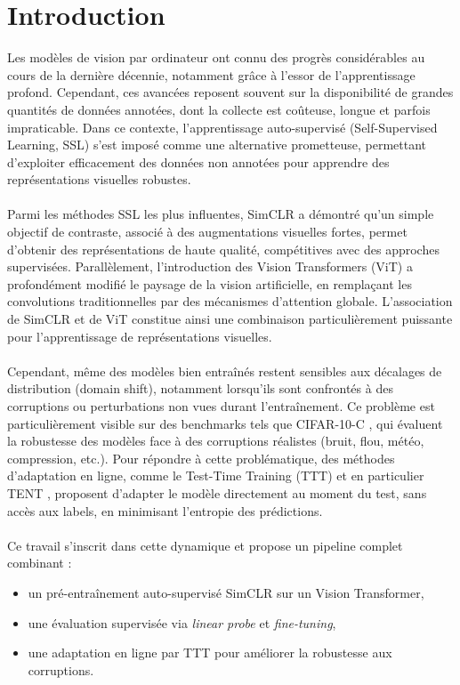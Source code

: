 \documentclass[12pt,a4paper]{report}
\begin{document}
	\chapter{Introduction}	
	Les modèles de vision par ordinateur ont connu des progrès considérables au cours de la dernière décennie, notamment grâce à l’essor de l’apprentissage profond. Cependant, ces avancées reposent souvent sur la disponibilité de grandes quantités de données annotées, dont la collecte est coûteuse, longue et parfois impraticable. Dans ce contexte, l’apprentissage auto-supervisé (Self-Supervised Learning, SSL) s’est imposé comme une alternative prometteuse, permettant d’exploiter efficacement des données non annotées pour apprendre des représentations visuelles robustes.\\\\
	Parmi les méthodes SSL les plus influentes, SimCLR \cite{chen2020simclr} a démontré qu’un simple objectif de contraste, associé à des augmentations visuelles fortes, permet d’obtenir des représentations de haute qualité, compétitives avec des approches supervisées. Parallèlement, l’introduction des Vision Transformers (ViT) \cite{dosovitskiy2020vit} a profondément modifié le paysage de la vision artificielle, en remplaçant les convolutions traditionnelles par des mécanismes d’attention globale. L’association de SimCLR et de ViT constitue ainsi une combinaison particulièrement puissante pour l’apprentissage de représentations visuelles.\\\\
	Cependant, même des modèles bien entraînés restent sensibles aux décalages de distribution (domain shift), notamment lorsqu’ils sont confrontés à des corruptions ou perturbations non vues durant l’entraînement. Ce problème est particulièrement visible sur des benchmarks tels que CIFAR-10-C \cite{hendrycks2019benchmark}, qui évaluent la robustesse des modèles face à des corruptions réalistes (bruit, flou, météo, compression, etc.). Pour répondre à cette problématique, des méthodes d’adaptation en ligne, comme le Test-Time Training (TTT) et en particulier TENT \cite{wang2021tent}, proposent d’adapter le modèle directement au moment du test, sans accès aux labels, en minimisant l’entropie des prédictions.\\\\
	Ce travail s’inscrit dans cette dynamique et propose un pipeline complet combinant :
	\begin{itemize}
		\item un pré-entraînement auto-supervisé SimCLR sur un Vision Transformer,
		\item une évaluation supervisée via \textit{linear probe} et \textit{fine-tuning},
		\item une adaptation en ligne par TTT pour améliorer la robustesse aux corruptions.\\\\
	\end{itemize}
\end{document}
